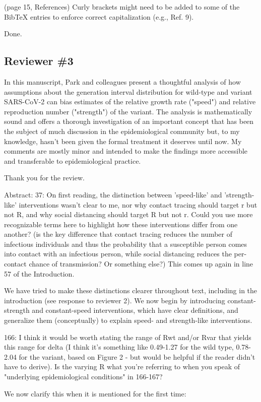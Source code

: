 \documentclass[12pt]{article}
\newcommand{\rev}{\subsection*}
\newcommand{\revtext}{\textsf}
\begin{document}
\revtext{(page 15, References) Curly brackets might need to be added to some of
the BibTeX entries to enforce correct capitalization (e.g., Ref. 9).}

Done.

\rev{Reviewer \#3}

\revtext{In this manuscript, Park and colleagues present a thoughtful analysis of how assumptions about the generation interval distribution for wild-type and variant SARS-CoV-2 can bias estimates of the relative growth rate ("speed") and relative reproduction number ("strength") of the variant. The analysis is mathematically sound and offers a thorough investigation of an important concept that has been the subject of much discussion in the epidemiological community but, to my knowledge, hasn't been given the formal treatment it deserves until now. My comments are mostly minor and intended to make the findings more accessible and transferable to epidemiological practice.}

Thank you for the review.

\revtext{Abstract: 37: On first reading, the distinction between 'speed-like' and 'strength-like' interventions wasn't clear to me, nor why contact tracing should target r but not R, and why social distancing should target R but not r. Could you use more recognizable terms here to highlight how these interventions differ from one another? (is the key difference that contact tracing reduces the number of infectious individuals and thus the probability that a susceptible person comes into contact with an infectious person, while social distancing reduces the per-contact chance of transmission? Or something else?) This comes up again in line 57 of the Introduction.}

We have tried to make these distinctions clearer throughout text, including in the introduction (see response to reviewer 2). We now begin by introducing constant-strength and constant-speed interventions, which have clear definitions, and generalize them (conceptually) to explain speed- and strength-like interventions.

\revtext{166: I think it would be worth stating the range of Rwt and/or Rvar that yields this range for delta (I think it's something like 0.49-1.27 for the wild type, 0.78-2.04 for the variant, based on Figure 2 - but would be helpful if the reader didn't have to derive). Is the varying R what you're referring to when you speak of "underlying epidemiological conditions" in 166-167?}

We now clarify this when it is mentioned for the first time:
\end{document}
